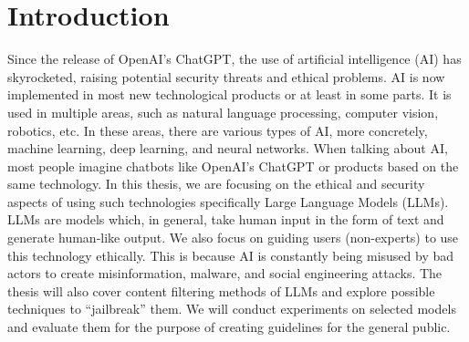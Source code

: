 \chapter{Introduction}



Since the release of OpenAI's ChatGPT, the use of artificial intelligence (AI) has skyrocketed, raising potential security threats and ethical problems. AI is now implemented in most new technological products or at least in some parts. It is used in multiple areas, such as natural language processing, computer vision, robotics, etc. In these areas, there are various types of AI, more concretely, machine learning, deep learning, and neural networks. When talking about AI, most people imagine chatbots like OpenAI's ChatGPT or products based on the same technology. In this thesis, we are focusing on the ethical and security aspects of using such technologies specifically Large Language Models (LLMs). LLMs are models which, in general, take human input in the form of text and generate human-like output. We also focus on guiding users (non-experts) to use this technology ethically. This is because AI is constantly being misused by bad actors to create misinformation, malware, and social engineering attacks. The thesis will also cover content filtering methods of LLMs and explore possible techniques to ``jailbreak'' them. We will conduct experiments on selected models and evaluate them for the purpose of creating guidelines for the general public.

